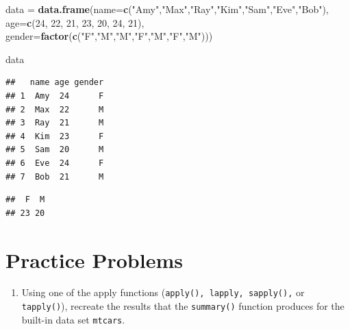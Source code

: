 \documentclass[
]{book}
\newenvironment{Shaded}{\begin{snugshade}}{\end{snugshade}}
\newcommand{\DataTypeTok}[1]{\textcolor[rgb]{0.13,0.29,0.53}{#1}}
\newcommand{\DecValTok}[1]{\textcolor[rgb]{0.00,0.00,0.81}{#1}}
\newcommand{\KeywordTok}[1]{\textcolor[rgb]{0.13,0.29,0.53}{\textbf{#1}}}
\newcommand{\NormalTok}[1]{#1}
\newcommand{\OperatorTok}[1]{\textcolor[rgb]{0.81,0.36,0.00}{\textbf{#1}}}
\newcommand{\StringTok}[1]{\textcolor[rgb]{0.31,0.60,0.02}{#1}}
\providecommand{\tightlist}{%
  \setlength{\itemsep}{0pt}\setlength{\parskip}{0pt}}
\begin{document}
\begin{Shaded}
\begin{Highlighting}[]
\NormalTok{data =}\StringTok{ }\KeywordTok{data.frame}\NormalTok{(}\DataTypeTok{name=}\KeywordTok{c}\NormalTok{(}\StringTok{"Amy"}\NormalTok{,}\StringTok{"Max"}\NormalTok{,}\StringTok{"Ray"}\NormalTok{,}\StringTok{"Kim"}\NormalTok{,}\StringTok{"Sam"}\NormalTok{,}\StringTok{"Eve"}\NormalTok{,}\StringTok{"Bob"}\NormalTok{), }
                  \DataTypeTok{age=}\KeywordTok{c}\NormalTok{(}\DecValTok{24}\NormalTok{, }\DecValTok{22}\NormalTok{, }\DecValTok{21}\NormalTok{, }\DecValTok{23}\NormalTok{, }\DecValTok{20}\NormalTok{, }\DecValTok{24}\NormalTok{, }\DecValTok{21}\NormalTok{),}
                  \DataTypeTok{gender=}\KeywordTok{factor}\NormalTok{(}\KeywordTok{c}\NormalTok{(}\StringTok{"F"}\NormalTok{,}\StringTok{"M"}\NormalTok{,}\StringTok{"M"}\NormalTok{,}\StringTok{"F"}\NormalTok{,}\StringTok{"M"}\NormalTok{,}\StringTok{"F"}\NormalTok{,}\StringTok{"M"}\NormalTok{))) }

\NormalTok{data}
\end{Highlighting}
\end{Shaded}

\begin{verbatim}
##   name age gender
## 1  Amy  24      F
## 2  Max  22      M
## 3  Ray  21      M
## 4  Kim  23      F
## 5  Sam  20      M
## 6  Eve  24      F
## 7  Bob  21      M
\end{verbatim}

\begin{Shaded}
\end{Shaded}

\begin{verbatim}
##  F  M 
## 23 20
\end{verbatim}

\hypertarget{practice-problems-1}{%
\section*{Practice Problems}\label{practice-problems-1}}

\begin{enumerate}
\def\labelenumi{\arabic{enumi})}
\tightlist
\item
  Using one of the apply functions (\texttt{apply(),\ lapply,\ sapply(),} or \texttt{tapply()}), recreate the results that the \texttt{summary()} function produces for the built-in data set \texttt{mtcars}.
\end{enumerate}
\end{document}
